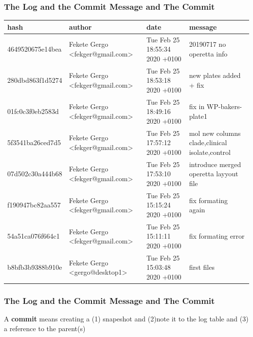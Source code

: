 \documentclass[aspectratio=169]{beamer}
\begin{document}
\begin{frame}
\frametitle<presentation>{The Log and the Commit Message and The Commit}
\begin{table}
\tiny
\begin{tabular}{|p{2cm}|p{3cm}|p{3cm}|p{4cm}| }
 \hline
 hash & author & date & message\\ 
 \hline
 4649520675e14bea&Fekete Gergo <fekger@gmail.com>&Tue Feb 25 18:55:34 2020 +0100& 20190717 no operetta info\\
 280dbd863f1d5274&Fekete Gergo <fekger@gmail.com>&Tue Feb 25 18:53:18 2020 +0100& new plates added + fix\\
 01fc0c3f0eb2583d&Fekete Gergo <fekger@gmail.com>&Tue Feb 25 18:49:16 2020 +0100& fix in WP-bakers-plate1\\
 5f3541ba26ced7d5&Fekete Gergo <fekger@gmail.com>&Tue Feb 25 17:57:12 2020 +0100& mol new columns clade,clinical isolate,control\\
 07d502c30a444b68&Fekete Gergo <fekger@gmail.com>&Tue Feb 25 17:53:10 2020 +0100& introduce merged operetta layyout file\\
 f190947bc82aa557&Fekete Gergo <fekger@gmail.com>&Tue Feb 25 15:15:24 2020 +0100& fix formating again\\
 54a51ca076f664c1&Fekete Gergo <fekger@gmail.com>&Tue Feb 25 15:11:11 2020 +0100& fix formating error\\
 b8bfb3b9388b910e&Fekete Gergo <gergo@desktop1>&Tue Feb 25 15:03:48 2020 +0100& first files\\
 \end{tabular}

\end{table}


\end{frame}

\begin{frame}
\frametitle<presentation>{The Log and the Commit Message and The Commit}

  A \textbf{commit} means creating a (1) snapeshot and (2)note it to the log table and (3) a reference to the parent(s)
  
\end{frame}
\end{document}
